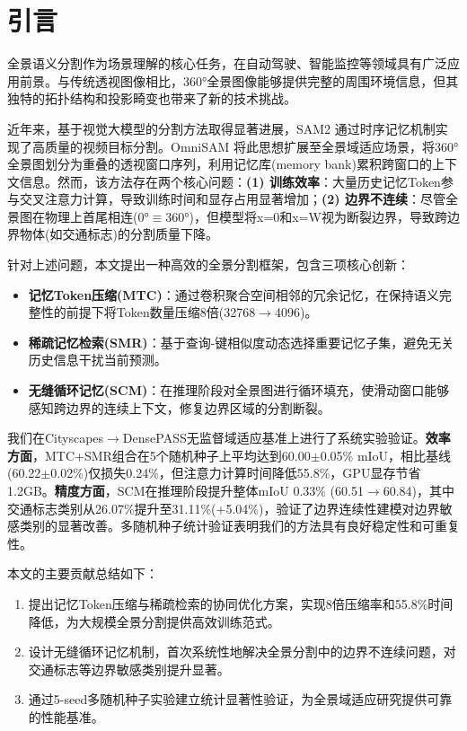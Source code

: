 \section{引言}

全景语义分割作为场景理解的核心任务，在自动驾驶、智能监控等领域具有广泛应用前景\cite{opencv_fisheye}。与传统透视图像相比，360°全景图像能够提供完整的周围环境信息，但其独特的拓扑结构和投影畸变也带来了新的技术挑战。

近年来，基于视觉大模型的分割方法取得显著进展，SAM2\cite{ravi2025sam2} 通过时序记忆机制实现了高质量的视频目标分割。OmniSAM\cite{zhong2025omnisam} 将此思想扩展至全景域适应场景，将360°全景图划分为重叠的透视窗口序列，利用记忆库(memory bank)累积跨窗口的上下文信息。然而，该方法存在两个核心问题：\textbf{(1) 训练效率}：大量历史记忆Token参与交叉注意力计算，导致训练时间和显存占用显著增加；\textbf{(2) 边界不连续}：尽管全景图在物理上首尾相连(0°$\equiv$360°)，但模型将x=0和x=W视为断裂边界，导致跨边界物体(如交通标志)的分割质量下降。

针对上述问题，本文提出一种高效的全景分割框架，包含三项核心创新：

\begin{itemize}
\item \textbf{记忆Token压缩(MTC)}：通过卷积聚合空间相邻的冗余记忆，在保持语义完整性的前提下将Token数量压缩8倍(32768$\rightarrow$4096)。
\item \textbf{稀疏记忆检索(SMR)}：基于查询-键相似度动态选择重要记忆子集，避免无关历史信息干扰当前预测。
\item \textbf{无缝循环记忆(SCM)}：在推理阶段对全景图进行循环填充，使滑动窗口能够感知跨边界的连续上下文，修复边界区域的分割断裂。
\end{itemize}

我们在Cityscapes$\rightarrow$DensePASS无监督域适应基准上进行了系统实验验证。\textbf{效率方面}，MTC+SMR组合在5个随机种子上平均达到60.00$\pm$0.05\% mIoU，相比基线(60.22$\pm$0.02\%)仅损失0.24\%，但注意力计算时间降低55.8\%，GPU显存节省1.2GB。\textbf{精度方面}，SCM在推理阶段提升整体mIoU 0.33\% (60.51$\rightarrow$60.84)，其中交通标志类别从26.07\%提升至31.11\%(+5.04\%)，验证了边界连续性建模对边界敏感类别的显著改善。多随机种子统计验证表明我们的方法具有良好稳定性和可重复性。

本文的主要贡献总结如下：

\begin{enumerate}
\item 提出记忆Token压缩与稀疏检索的协同优化方案，实现8倍压缩率和55.8\%时间降低，为大规模全景分割提供高效训练范式。
\item 设计无缝循环记忆机制，首次系统性地解决全景分割中的边界不连续问题，对交通标志等边界敏感类别提升显著。
\item 通过5-seed多随机种子实验建立统计显著性验证，为全景域适应研究提供可靠的性能基准。
\end{enumerate}
